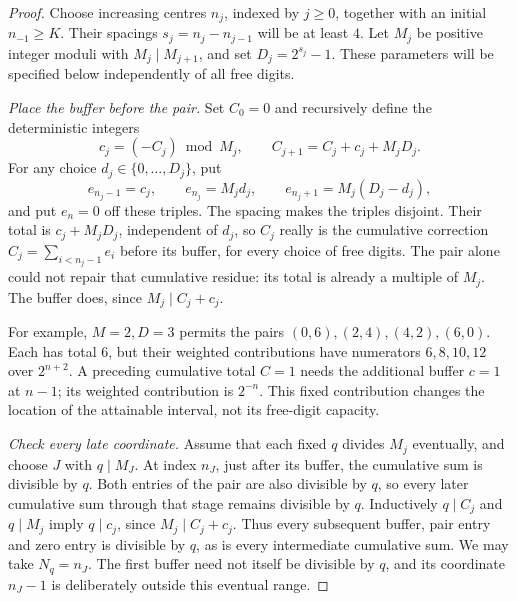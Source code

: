 \documentclass[11pt]{article}
\begin{document}
\begin{proof}
Choose increasing centres $n_j$, indexed by $j\ge0$, together with an initial
$n_{-1}\ge K$.  Their spacings $s_j=n_j-n_{j-1}$ will be at least $4$.
Let $M_j$ be positive integer moduli with $M_j\mid M_{j+1}$, and set
$D_j=2^{s_j}-1$.  These parameters will be specified below independently of
all free digits.

\emph{Place the buffer before the pair.}
Set $C_0=0$ and recursively define the deterministic integers
\[
 c_j=(-C_j)\bmod M_j,\qquad C_{j+1}=C_j+c_j+M_jD_j.
\]
For any choice $d_j\in\{0,\ldots,D_j\}$, put
\begin{equation}\label{long251:eq:sparse-triple}
 e_{n_j-1}=c_j,\qquad e_{n_j}=M_jd_j,\qquad
 e_{n_j+1}=M_j(D_j-d_j),
\end{equation}
and put $e_n=0$ off these triples.  The spacing makes the triples disjoint.
Their total is $c_j+M_jD_j$, independent of $d_j$, so $C_j$ really is the
cumulative correction $C_j=\sum_{i<n_j-1}e_i$ before its buffer, for every choice of free digits.
The pair alone could not repair that cumulative residue: its total is
already a multiple of $M_j$.  The buffer does, since $M_j\mid C_j+c_j$.

For example, $M=2,D=3$ permits the pairs $(0,6),(2,4),(4,2),(6,0)$.
Each has total $6$, but their weighted contributions have numerators
$6,8,10,12$ over $2^{n+2}$.  A preceding cumulative total $C=1$ needs the
additional buffer $c=1$ at $n-1$; its weighted contribution is $2^{-n}$.
This fixed contribution changes the location of the attainable interval,
not its free-digit capacity.

\emph{Check every late coordinate.}
Assume that each fixed $q$ divides $M_j$ eventually, and choose $J$ with
$q\mid M_J$.  At index $n_J$, just after its buffer, the cumulative sum
is divisible by $q$.  Both entries of the pair are also divisible by $q$,
so every later cumulative sum through that stage remains divisible by $q$.
Inductively $q\mid C_j$ and $q\mid M_j$ imply
$q\mid c_j$, since $M_j\mid C_j+c_j$.  Thus every subsequent buffer,
pair entry and zero entry is divisible by $q$, as is every intermediate
cumulative sum.  We may take $N_q=n_J$.  The first buffer need not itself
be divisible by $q$, and its coordinate $n_J-1$ is deliberately outside
this eventual range.


\end{proof}
\end{document}
